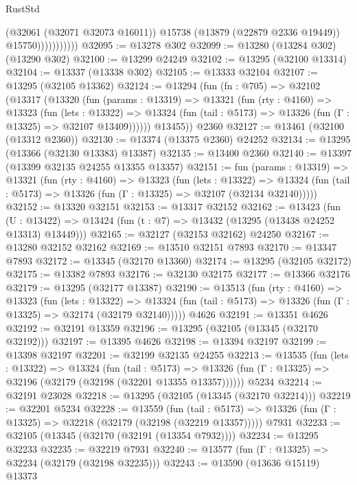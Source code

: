 \begin{lexlean}{RustStd}
\begin{coremodule}
                          (@32061 (@32071 @32073 @16011))
                          @15738
                          (@13879 (@22879 @2336 @19449))
                          @15750)))))))))))
@32095 := @13278 @302
@32099 := @13280 (@13284 @302) (@13290 @302)
@32100 := @13299 @24249
@32102 := @13295 (@32100 @13314)
@32104 := @13337 (@13338 @302)
@32105 := @13333 @32104
@32107 := @13295 (@32105 @13362)
@32124 := @13294
    (fun (fn : @705) =>
    @32102
      (@13317
        (@13320
          (fun (params : @13319) =>
          @13321
            (fun (rty : @4160) =>
            @13323
              (fun (lets : @13322) =>
              @13324 (fun (tail : @5173) => @13326 (fun (Γ : @13325) => @32107 @13409))))))
        @13455))
    @2360
@32127 := @13461 (@32100 (@13312 @2360))
@32130 := @13374 (@13375 @2360) @24252
@32134 := @13295 (@13366 (@32130 @13383) @13387)
@32135 := @13400 @2360
@32140 := @13397 (@13399 @32135 @24255 @13355 @13357)
@32151 := fun (params : @13319) =>
  @13321
    (fun (rty : @4160) =>
    @13323
      (fun (lets : @13322) =>
      @13324 (fun (tail : @5173) => @13326 (fun (Γ : @13325) => @32107 (@32134 @32140)))))
@32152 := @13320 @32151
@32153 := @13317 @32152
@32162 := @13423
    (fun (U : @13422) => @13424 (fun (t : @7) => @13432 (@13295 (@13438 @24252 @13313) @13449)))
@32165 := @32127 (@32153 @32162) @24250
@32167 := @13280 @32152 @32162
@32169 := @13510 @32151 @7893
@32170 := @13347 @7893
@32172 := @13345 (@32170 @13360)
@32174 := @13295 (@32105 @32172)
@32175 := @13382 @7893
@32176 := @32130 @32175
@32177 := @13366 @32176
@32179 := @13295 (@32177 @13387)
@32190 := @13513
    (fun (rty : @4160) =>
    @13323
      (fun (lets : @13322) =>
      @13324 (fun (tail : @5173) => @13326 (fun (Γ : @13325) => @32174 (@32179 @32140)))))
    @4626
@32191 := @13351 @4626
@32192 := @32191 @13359
@32196 := @13295 (@32105 (@13345 (@32170 @32192)))
@32197 := @13395 @4626
@32198 := @13394 @32197
@32199 := @13398 @32197
@32201 := @32199 @32135 @24255
@32213 := @13535
    (fun (lets : @13322) =>
    @13324
      (fun (tail : @5173) =>
      @13326 (fun (Γ : @13325) => @32196 (@32179 (@32198 (@32201 @13355 @13357))))))
    @5234
@32214 := @32191 @23028
@32218 := @13295 (@32105 (@13345 (@32170 @32214)))
@32219 := @32201 @5234
@32228 := @13559
    (fun (tail : @5173) => @13326 (fun (Γ : @13325) => @32218 (@32179 (@32198 (@32219 @13357)))))
    @7931
@32233 := @32105 (@13345 (@32170 (@32191 (@13354 @7932))))
@32234 := @13295 @32233
@32235 := @32219 @7931
@32240 := @13577 (fun (Γ : @13325) => @32234 (@32179 (@32198 @32235)))
@32243 := @13590 (@13636 @15119) @13373

\end{coremodule}
\end{lexlean}
